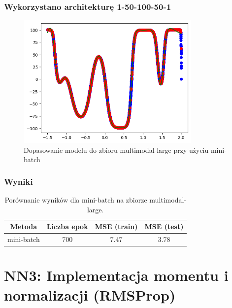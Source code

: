 \documentclass{article}
\begin{document}
\subsubsection*{Wykorzystano architekturę 1-50-100-50-1}
\begin{figure}[H]
    \centering
    \includegraphics[width=0.8\textwidth]{img/nn2/multimodal-large_mini-batch_training_fit.png}
    \caption{Dopasowanie modelu do zbioru multimodal-large przy użyciu mini-batch}
\end{figure}

\subsubsection*{Wyniki}
\begin{table}[H]
    \centering
    \begin{tabular}{|c|c|c|c|}
        \hline
        Metoda & Liczba epok & MSE (train) & MSE (test) \\
        \hline
        mini-batch & 700 & 7.47 & 3.78 \\
        \hline
    \end{tabular}
    \caption{Porównanie wyników dla mini-batch na zbiorze multimodal-large.}
\end{table}

\section*{NN3: Implementacja momentu i normalizacji (RMSProp)}
\end{document}
